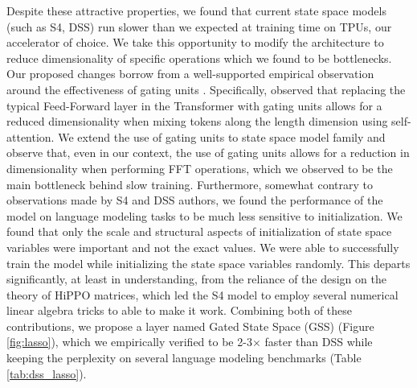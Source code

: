 Despite these attractive properties, we found that current state space models (such as S4, DSS) run slower than we expected at training time on TPUs, our accelerator of choice. We take this opportunity to modify the architecture to reduce dimensionality of specific operations which we found to be bottlenecks. Our proposed changes borrow from a well-supported empirical observation around the effectiveness of gating units \citep{Shazeer2020GLUVI}. Specifically, \cite{flash_hua2022transformer} observed that replacing the typical Feed-Forward layer in the Transformer with gating units allows for a reduced dimensionality when mixing tokens along the length dimension using self-attention. We extend the use of gating units to state space model family and observe that, even in our context, the use of gating units allows for a reduction in dimensionality when performing FFT operations, which we observed to be the main bottleneck behind slow training. Furthermore, somewhat contrary to observations made by S4 and DSS authors, we found the performance of the model on language modeling tasks to be much less sensitive to initialization. We found that only the scale and structural aspects of initialization of state space variables were important and not the exact values. We were able to successfully train the model while initializing the state space variables randomly. This departs significantly, at least in understanding, from the reliance of the design on the theory of HiPPO matrices, which led the S4 model to employ several numerical linear algebra tricks to able to make it work. Combining both of these contributions, we propose a layer named Gated State Space (GSS) (Figure \ref{fig:lasso}), which we empirically verified to be 2-3$\times$ faster than DSS while keeping the perplexity on several language modeling benchmarks (Table \ref{tab:dss_lasso}).

